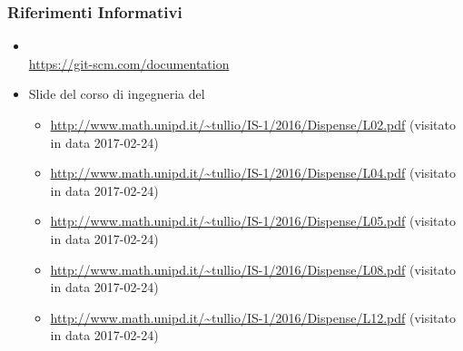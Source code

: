 	    \subsubsection{Riferimenti Informativi}
        \begin{itemize}
        \item {} \\
        \url{https://git-scm.com/documentation}
         \item Slide del corso di ingegneria del 
          \begin{itemize}
           \item \url{http://www.math.unipd.it/~tullio/IS-1/2016/Dispense/L02.pdf} (visitato in data 2017-02-24)
           \item \url{http://www.math.unipd.it/~tullio/IS-1/2016/Dispense/L04.pdf} (visitato in data 2017-02-24)
           \item \url{http://www.math.unipd.it/~tullio/IS-1/2016/Dispense/L05.pdf} (visitato in data 2017-02-24)
           \item \url{http://www.math.unipd.it/~tullio/IS-1/2016/Dispense/L08.pdf} (visitato in data 2017-02-24)
           \item \url{http://www.math.unipd.it/~tullio/IS-1/2016/Dispense/L12.pdf} (visitato in data 2017-02-24)
          \end{itemize}
        \end{itemize}
